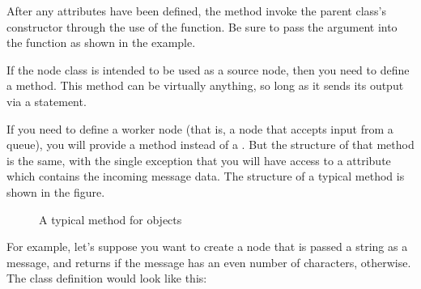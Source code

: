 \documentclass[letterpaper,10pt,english]{sphinxmanual}
\let\sphinxpxdimen\pdfpxdimen\else\newdimen\sphinxpxdimen
\begin{document}
After any attributes have been defined, the  method 
invoke the parent class’s constructor through the use of the 
function. Be sure to pass the  argument into the function as
shown in the example.

If the node class is intended to be used as a source node, then you need to
define a  method. This method can be virtually anything, so long
as it sends its output via a  statement.

If you need to define a worker node (that is, a node that accepts input
from a queue), you will provide a  method instead of a
. But the structure of that method is the same, with the single
exception that you will have access to a  attribute which
contains the incoming message data. The structure of a typical 
method is shown in the figure.

\begin{figure}[htbp]
\centering
\capstart

\noindent\sphinxincludegraphics[width=400\sphinxpxdimen]{{process_item}.png}
\caption{A typical  method for  objects}\label{\detokenize{overview:id4}}\end{figure}

For example, let’s suppose you want to create a node that is passed a string as a
message, and returns  if the message has an even number of
characters,  otherwise. The class definition would look like
this:

%
\begin{sphinxVerbatim}[commandchars=\\\{\}]
 
     
         

     
             
             
             
\end{sphinxVerbatim}
\end{document}
